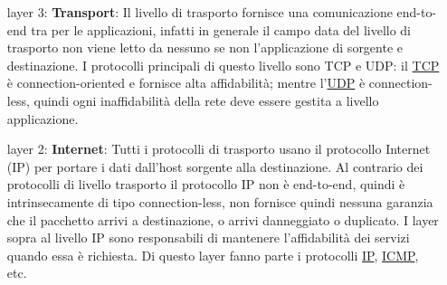 \begin{enumerate}
    \item[layer 3:] \textbf{Transport}: Il livello di trasporto fornisce una comunicazione end-to-end tra per le applicazioni, infatti in generale il campo data del livello di trasporto non viene letto da nessuno se non l'applicazione di sorgente e destinazione. I protocolli principali di questo livello sono TCP e UDP: il \href{https://en.wikipedia.org/wiki/Transmission_Control_Protocol}{TCP} è connection-oriented e fornisce alta affidabilità; mentre l'\href{https://en.wikipedia.org/wiki/User_Datagram_Protocol}{UDP} è connection-less, quindi ogni inaffidabilità della rete deve essere gestita a livello applicazione.

    \item[layer 2:] \textbf{Internet}: Tutti i protocolli di trasporto usano il protocollo Internet (IP) per portare i dati dall'host sorgente alla destinazione. Al contrario dei protocolli di livello trasporto il protocollo IP non è end-to-end, quindi è intrinsecamente di tipo connection-less, non fornisce quindi nessuna garanzia che il pacchetto arrivi a destinazione, o arrivi danneggiato o duplicato. I layer sopra al livello IP sono responsabili di mantenere l'affidabilità dei servizi quando essa è richiesta. Di questo layer fanno parte i protocolli \href{https://en.wikipedia.org/wiki/Internet_Protocol}{IP}, \href{https://en.wikipedia.org/wiki/Internet_Control_Message_Protocol}{ICMP}, etc.

\end{enumerate}
